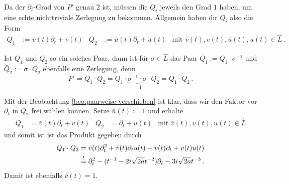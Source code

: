 Da der $\partial_t$-Grad von $P'$ genau $2$ ist, müssen die $Q_i$
jeweils den Grad $1$ haben, um eine echte nichttriviale Zerlegung zu bekommen.
Allgemein haben dir $Q_i$ also die Form
\begin{align*}
Q_1&:=\bar v(t) \partial_t + v(t) & Q_2&:=\bar u(t)\partial_t + u(t)
& \mbox{mit } \bar v(t), v(t), \bar u(t), u(t)\in \hat L \,.
\end{align*}
\begin{beo} \label{beo:paarweise-verschieben}
Ist $Q_1$ und $Q_2$ so ein solches Paar, dann ist für $\sigma\in \hat L$ das
Paar $\bar Q_1:=Q_1\cdot \sigma^{-1}$ und $\bar Q_2:=\sigma\cdot Q_2$ ebenfalls
eine Zerlegung, denn
\[
P'=Q_1\cdot Q_2= Q_1\cdot
\underset{=1}{\underbrace{
  \sigma^{-1} \cdot \sigma
}}
\cdot Q_2 =\bar Q_1 \cdot \bar Q_2 \,.
\]
\end{beo}
Mit der Beobachtung \ref{beo:paarweise-verschieben} ist klar, dass wir den
Faktor vor $\partial_t$ in $Q_2$ frei wählen können. Setze $\bar u(t):=1$ und
erhalte
\begin{align*}
Q_1&=\bar v(t) \partial_t + v(t) & Q_2&=\partial_t + u(t)
& \mbox{mit } \bar v(t), v(t), u(t)\in \hat L
\end{align*}
und somit ist ist das Produkt gegeben durch
\begin{align} \label{eq:schritt100}
Q_1\cdot Q_2&=\bar v(t) \partial_t^2 + \bar v(t)\partial_t u(t) +
  v(t)\partial_t + v(t)u(t)
\notag\\&\overset{!}{=} \partial_t^2 - (t^{-1} - 2i\sqrt{2a}t^{-2})\partial_t
  - 3 i\sqrt{2a}t^{-3} \,.
\end{align}
Damit ist ebenfalls $\bar v(t)=1$.

